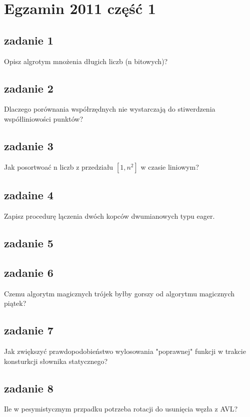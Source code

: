 
\chapter{Egzamin 2011 część 1}

\section{zadanie 1}
Opisz algrotym mnożenia długich liczb (n bitowych)?

\section{zadanie 2}
Dlaczego porównania współrzędnych nie wystarczają do stiwerdzenia współliniowości punktów?

\section{zadanie 3} 
Jak posortwoać n liczb z przedziału $[1, n^2]$ w  czasie liniowym?

\section{zadaine 4}
Zapisz procedurę lączenia dwóch kopców dwumianowych typu eager.

\section{zadanie 5}


\section{zadanie 6}
Czemu algorytm magicznych trójek byłby gorszy od algorytmu magicznych piątek?

\section{zadanie 7}
Jak zwiększyć prawdopodobieństwo wylosowania "poprawnej" funkcji w trakcie konsturkcji słownika statycznego?

\section{zadanie 8}
Ile w pesymistycznym przpadku potrzeba rotacji do usunięcia węzła z AVL?

